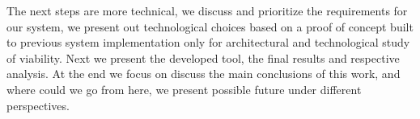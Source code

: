\indent The next steps are more technical, we discuss and prioritize the requirements for our system, we present out technological choices based on a proof of concept built to previous system implementation only for architectural and technological study of viability. Next we present the developed tool, the final results and respective analysis. At the end we focus on discuss the main conclusions of this work, and where could we go from here, we present possible future under different perspectives.
